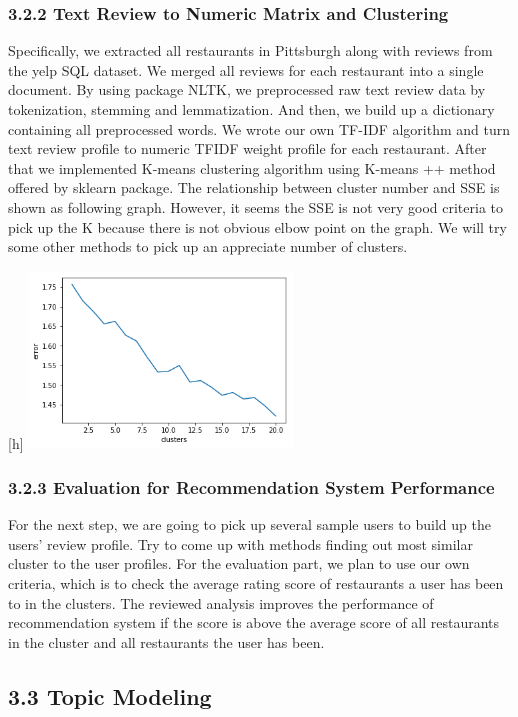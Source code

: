 \documentclass{neu_handout}
\begin{document}
\subsubsection*{3.2.2 Text Review to Numeric Matrix and Clustering}
Specifically, we extracted all restaurants in Pittsburgh along with reviews from the yelp SQL dataset. We merged all reviews for each restaurant into a single document. By using package NLTK, we preprocessed raw text review data by tokenization, stemming and lemmatization. And then, we build up a dictionary containing all preprocessed words. We wrote our own TF-IDF algorithm and turn text review profile to numeric TFIDF weight profile for each restaurant. After that we implemented K-means clustering algorithm using K-means ++ method offered by sklearn package. The relationship between cluster number and SSE is shown as following graph. However, it seems the SSE is not very good criteria to pick up the K because there is not obvious elbow point on the graph. We will try some other methods to pick up an appreciate number of clusters. 

\begin{center}[h]
	\includegraphics[width=70mm,scale=0.5]{KvsError}
\end{center}

\subsubsection*{3.2.3 Evaluation for Recommendation System Performance}
For the next step, we are going to pick up several sample users to build up the users’ review profile. Try to come up with methods finding out most similar cluster to the user profiles. For the evaluation part, we plan to use our own criteria, which is to check the average rating score of restaurants a user has been to in the clusters. The reviewed analysis improves the performance of recommendation system if the score is above the average score of all restaurants in the cluster and all restaurants the user has been. 
 
\subsection*{3.3 Topic Modeling}
\end{document}
